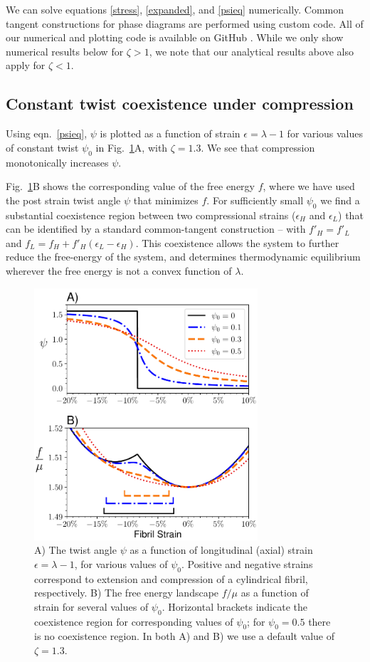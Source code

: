 \documentclass[twoside,twocolumn,9pt]{article}
\begin{document}
We can solve equations \ref{stress}, \ref{expanded}, and \ref{psieq} numerically. Common tangent constructions for phase diagrams are performed using custom code.  All of our numerical and plotting code is available on GitHub \cite{github}. While we only show numerical results below for $\zeta>1$, we note that our analytical results above also apply for $\zeta < 1$. 

\subsection{Constant twist coexistence under compression} 
Using eqn.~\eqref{psieq}, $\psi$ is plotted as a function of strain $\epsilon=\lambda-1$ for various values of constant twist $\psi_0$ in Fig.~\ref{fig:energylandscape}A, with $\zeta=1.3$.  We see that compression monotonically increases $\psi$. 

Fig.~\ref{fig:energylandscape}B shows the corresponding value of the free energy $f$, where we have used the post strain twist angle $\psi$ that minimizes $f$. For sufficiently small $\psi_0$ we find a substantial coexistence region between two compressional strains ($\epsilon_H$ and $\epsilon_L$) that can be identified by a standard common-tangent construction -- with $f'_H = f'_L$ and $f_L =f_H+f'_H (\epsilon_L-\epsilon_H)$. This coexistence allows the system to further reduce the free-energy of the system, and determines thermodynamic equilibrium wherever the free energy is not a convex function of $\lambda$.

\begin{figure}[t!] %
\centering
  \includegraphics[width=8.3cm]{Figure_1.pdf}
  \caption{A) The twist angle $\psi$ as a function of longitudinal (axial) strain $\epsilon=\lambda-1$, for various values of $\psi_0$. Positive and negative strains correspond to extension and compression of a cylindrical fibril, respectively. B) The free energy landscape $f/\mu$ as a function of strain for several values of $\psi_0$. Horizontal brackets indicate the coexistence region for corresponding values of $\psi_0$; for $\psi_0=0.5$ there is no coexistence region. In both A) and B) we use a default value of $\zeta=1.3$.}
  \label{fig:energylandscape}
\end{figure}
\end{document}
